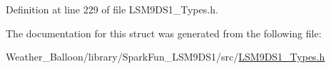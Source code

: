 Definition at line 229 of file L\+S\+M9\+D\+S1\+\_\+\+Types.\+h.



The documentation for this struct was generated from the following file\+:\begin{DoxyCompactItemize}
\item 
Weather\+\_\+\+Balloon/library/\+Spark\+Fun\+\_\+\+L\+S\+M9\+D\+S1/src/\hyperlink{_l_s_m9_d_s1___types_8h}{L\+S\+M9\+D\+S1\+\_\+\+Types.\+h}\end{DoxyCompactItemize}

